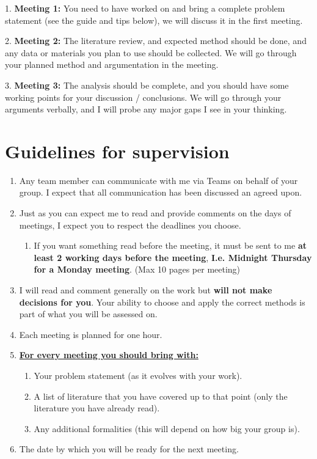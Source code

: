 \documentclass[
]{book}
\providecommand{\tightlist}{%
  \setlength{\itemsep}{0pt}\setlength{\parskip}{0pt}}
\begin{document}
1. \textbf{Meeting 1:} You need to have worked on and bring a complete
problem statement (see the guide and tips below), we will discuss it in
the first meeting.

2. \textbf{Meeting 2:} The literature review, and expected method should be
done, and any data or materials you plan to use should be collected. We
will go through your planned method and argumentation in the meeting.

3. \textbf{Meeting 3:} The analysis should be complete, and you should have
some working points for your discussion / conclusions. We will go
through your arguments verbally, and I will probe any major gaps I see
in your thinking.

\hypertarget{guidelines-for-supervision}{%
\chapter{Guidelines for supervision}\label{guidelines-for-supervision}}

\begin{enumerate}
\def\labelenumi{\arabic{enumi}.}
\item
  Any team member can communicate with me via Teams on behalf of your
  group. I expect that all communication has been discussed an
  agreed upon.
\item
  Just as you can expect me to read and provide comments on the days
  of meetings, I expect you to respect the deadlines you choose.

  \begin{enumerate}
  \def\labelenumii{\alph{enumii}.}
  \tightlist
  \item
    If you want something read before the meeting, it must be sent
    to me \textbf{at least 2 working days before the meeting}, \textbf{I.e.
    Midnight Thursday for a Monday meeting}. (Max 10 pages per
    meeting)
  \end{enumerate}
\item
  I will read and comment generally on the work but \textbf{will not make
  decisions for you}. Your ability to choose and apply the correct
  methods is part of what you will be assessed on.
\item
  Each meeting is planned for one hour.
\item
  \textbf{\underline{For every meeting you should bring with:}}

  \begin{enumerate}
  \def\labelenumii{\alph{enumii}.}
  \item
    Your problem statement (as it evolves with your work).
  \item
    A list of literature that you have covered up to that point
    (only the literature you have already read).
  \item
    Any additional formalities (this will depend on how big your
    group is).
  \end{enumerate}
\item
  The date by which you will be ready for the next meeting.
\end{enumerate}
\end{document}

